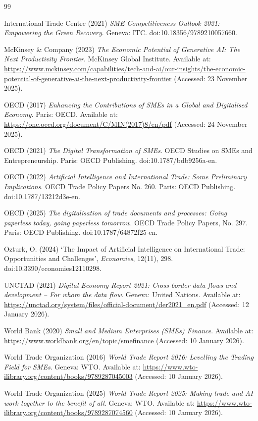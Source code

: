 \documentclass[12pt,a4paper]{report}
\begin{document}
\begin{thebibliography}{99}

International Trade Centre (2021) \textit{SME Competitiveness Outlook 2021: Empowering the Green Recovery}. Geneva: ITC. doi:10.18356/9789210057660.

McKinsey \& Company (2023) \textit{The Economic Potential of Generative AI: The Next Productivity Frontier}. McKinsey Global Institute. Available at: \url{https://www.mckinsey.com/capabilities/tech-and-ai/our-insights/the-economic-potential-of-generative-ai-the-next-productivity-frontier} (Accessed: 23 November 2025).

OECD (2017) \textit{Enhancing the Contributions of SMEs in a Global and Digitalised Economy}. Paris: OECD. Available at: \url{https://one.oecd.org/document/C/MIN(2017)8/en/pdf} (Accessed: 24 November 2025).

OECD (2021) \textit{The Digital Transformation of SMEs}. OECD Studies on SMEs and Entrepreneurship. Paris: OECD Publishing. doi:10.1787/bdb9256a-en.

OECD (2022) \textit{Artificial Intelligence and International Trade: Some Preliminary Implications}. OECD Trade Policy Papers No. 260. Paris: OECD Publishing. doi:10.1787/13212d3e-en.

OECD (2025) \textit{The digitalisation of trade documents and processes: Going paperless today, going paperless tomorrow}. OECD Trade Policy Papers, No. 297. Paris: OECD Publishing. doi:10.1787/64872f25-en.

Ozturk, O. (2024) ‘The Impact of Artificial Intelligence on International Trade: Opportunities and Challenges’, \textit{Economies}, 12(11), 298. doi:10.3390/economies12110298.

UNCTAD (2021) \textit{Digital Economy Report 2021: Cross-border data flows and development – For whom the data flow}. Geneva: United Nations. Available at: \url{https://unctad.org/system/files/official-document/der2021_en.pdf} (Accessed: 12 January 2026).

World Bank (2020) \textit{Small and Medium Enterprises (SMEs) Finance}. Available at: \url{https://www.worldbank.org/en/topic/smefinance} (Accessed: 10 January 2026).

World Trade Organization (2016) \textit{World Trade Report 2016: Levelling the Trading Field for SMEs}. Geneva: WTO. Available at: \url{https://www.wto-ilibrary.org/content/books/9789287045003} (Accessed: 10 January 2026).

World Trade Organization (2025) \textit{World Trade Report 2025: Making trade and AI work together to the benefit of all}. Geneva: WTO. Available at: \url{https://www.wto-ilibrary.org/content/books/9789287074560} (Accessed: 10 January 2026).

\end{thebibliography}
\endgroup
\end{document}
